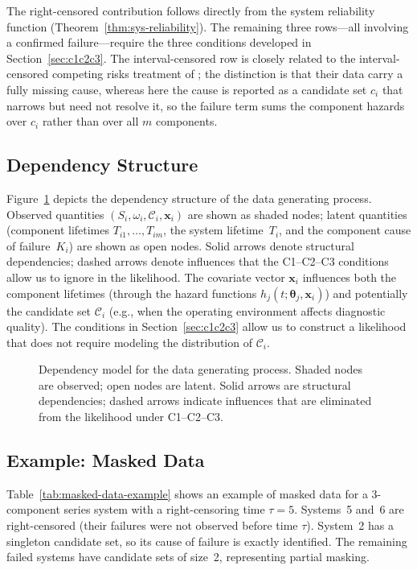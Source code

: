 \documentclass[11pt]{article}
\theoremstyle{definition}
\theoremstyle{plain}
\renewcommand{\v}[1]{\boldsymbol{#1}}
\begin{document}
The right-censored contribution follows directly from the system
reliability function (Theorem~\ref{thm:sys-reliability}).
The remaining three rows---all involving a confirmed failure---require the
three conditions developed in Section~\ref{sec:c1c2c3}.
The interval-censored row is closely related to the interval-censored
competing risks treatment of \citet{mitra2020}; the distinction is that
their data carry a fully missing cause, whereas here the cause is
reported as a candidate set $c_i$ that narrows but need not resolve it,
so the failure term sums the component hazards over $c_i$ rather than
over all $m$ components.

\subsection{Dependency Structure}
\label{sec:dependency-structure}

Figure~\ref{fig:dep-model} depicts the dependency structure of the data
generating process.
Observed quantities $(S_i, \omega_i, \mathcal{C}_i, \v{x}_i)$ are shown
as shaded nodes; latent quantities (component lifetimes
$T_{i1}, \ldots, T_{im}$, the system lifetime~$T_i$, and the component
cause of failure~$K_i$) are shown as open nodes.
Solid arrows denote structural dependencies; dashed arrows denote
influences that the C1--C2--C3 conditions allow us to ignore in the
likelihood.
The covariate vector $\v{x}_i$ influences both the component lifetimes
(through the hazard functions $h_j(t; \v{\theta}_j, \v{x}_i)$) and
potentially the candidate set $\mathcal{C}_i$ (e.g., when the operating
environment affects diagnostic quality).
The conditions in Section~\ref{sec:c1c2c3} allow us to construct a
likelihood that does not require modeling the distribution of
$\mathcal{C}_i$.

\begin{figure}[ht]
\centering

\caption{Dependency model for the data generating process.
Shaded nodes are observed; open nodes are latent.
Solid arrows are structural dependencies; dashed arrows indicate
influences that are eliminated from the likelihood under C1--C2--C3.}
\label{fig:dep-model}
\end{figure}

\subsection{Example: Masked Data}
\label{sec:example-masked-data}

Table~\ref{tab:masked-data-example} shows an example of masked data for a
3-component series system with a right-censoring time $\tau = 5$.
Systems~5 and~6 are right-censored (their failures were not observed
before time $\tau$).
System~2 has a singleton candidate set, so its cause of failure is exactly
identified.
The remaining failed systems have candidate sets of size~2,
representing partial masking.
\end{document}

